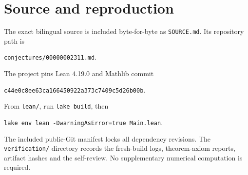 \documentclass[11pt]{article}
\theoremstyle{remark}
\begin{document}
\section*{Source and reproduction}
The exact bilingual source is included byte-for-byte as
\texttt{SOURCE.md}. Its repository path is
\begin{center}\small\texttt{conjectures/00000002311.md}.\end{center}
The project pins Lean 4.19.0 and Mathlib commit
\begin{center}\small\texttt{c44e0c8ee63ca166450922a373c7409c5d26b00b}.\end{center}
From \texttt{lean/}, run \texttt{lake build}, then
\begin{center}\small\texttt{lake env lean -DwarningAsError=true Main.lean}.\end{center}
The included public-Git manifest locks all dependency revisions.
The \texttt{verification/} directory records the fresh-build logs,
theorem-axiom reports, artifact hashes and the self-review.
No supplementary numerical computation is required.
\end{document}

